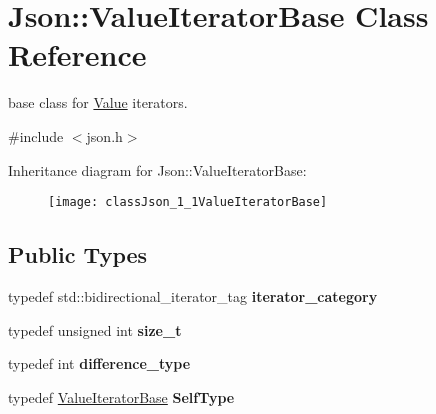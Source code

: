 \hypertarget{classJson_1_1ValueIteratorBase}{}\section{Json\+:\+:Value\+Iterator\+Base Class Reference}
\label{classJson_1_1ValueIteratorBase}


base class for \hyperlink{classJson_1_1Value}{Value} iterators.  




{\ttfamily \#include $<$json.\+h$>$}

Inheritance diagram for Json\+:\+:Value\+Iterator\+Base\+:\begin{figure}[H]
\begin{center}
\leavevmode
\texttt{[image: classJson\_1\_1ValueIteratorBase]}
\end{center}
\end{figure}
\subsection*{Public Types}
\begin{DoxyCompactItemize}
\item 
typedef std\+::bidirectional\+\_\+iterator\+\_\+tag {\bfseries iterator\+\_\+category}\hypertarget{classJson_1_1ValueIteratorBase_a02fd11a4fbdc0007da1e8bcf5e6b83c3}{}\label{classJson_1_1ValueIteratorBase_a02fd11a4fbdc0007da1e8bcf5e6b83c3}

\item 
typedef unsigned int {\bfseries size\+\_\+t}\hypertarget{classJson_1_1ValueIteratorBase_a9d3a3c7ce5cdefe23cb486239cf07bb5}{}\label{classJson_1_1ValueIteratorBase_a9d3a3c7ce5cdefe23cb486239cf07bb5}

\item 
typedef int {\bfseries difference\+\_\+type}\hypertarget{classJson_1_1ValueIteratorBase_a4e44bf8cbd17ec8d6e2c185904a15ebd}{}\label{classJson_1_1ValueIteratorBase_a4e44bf8cbd17ec8d6e2c185904a15ebd}

\item 
typedef \hyperlink{classJson_1_1ValueIteratorBase}{Value\+Iterator\+Base} {\bfseries Self\+Type}\hypertarget{classJson_1_1ValueIteratorBase_a9d2a940d03ea06d20d972f41a89149ee}{}\label{classJson_1_1ValueIteratorBase_a9d2a940d03ea06d20d972f41a89149ee}

\end{DoxyCompactItemize}
